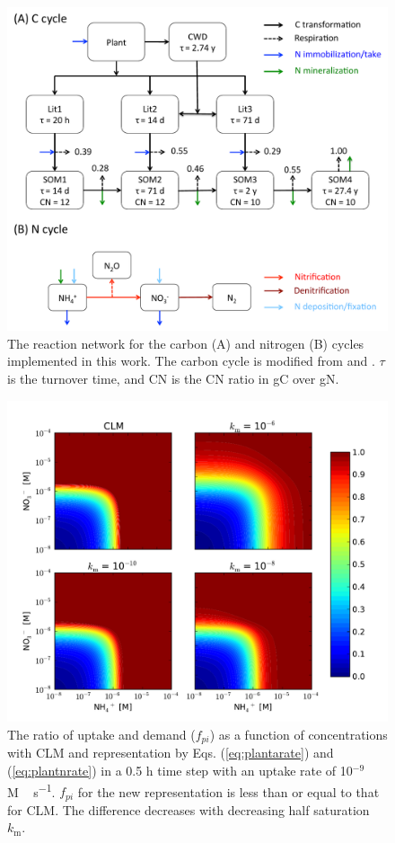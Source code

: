 \documentclass[gmd, manuscript]{copernicus}
\begin{document}



%

\clearpage
\begin{figure}[t]
\includegraphics[width=15cm]{../figs/fig01/fig01conceptualmodel.pdf}
\caption{The reaction network for the carbon (A) and nitrogen (B) cycles
implemented in this work. The carbon cycle is modified from
\citet{Thornton2005} and \citet{Bonan2012}. $\tau$ is the turnover time, and CN
is the CN ratio in gC over gN.}
\label{fig:conceptualmodel}
\end{figure}

\begin{figure}[t]
\includegraphics[width=12cm]{../figs/fig05/uptakef.pdf}
\caption{The ratio of uptake and demand ($f_{pi}$) as a
function of concentrations with CLM and representation by Eqs.
(\ref{eq:plantarate}) and (\ref{eq:plantnrate}) in a 0.5 h time step with an
uptake rate of 10$^{-9}$ \unit{M\,s^{-1}}. $f_{pi}$ for the new representation
is less than or equal to that for CLM. The difference decreases with decreasing
half saturation $k_\text{m}$.}
\label{fig:demanddistribution}
\end{figure}
\end{document}
